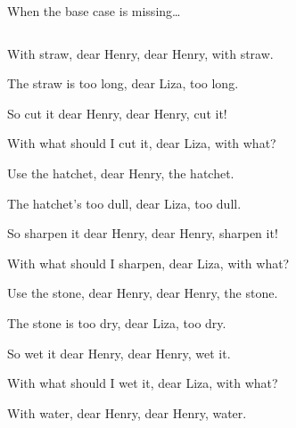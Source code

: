 \begin{Coupe}
\begin{frame}{When the base case is missing\ldots}
\begin{columns}
\begin{column}{.55\linewidth}
\begin{block}
{          %
          With straw, dear Henry, dear Henry, with \alert{straw}.

          The straw is too long, dear Liza, too long.
          
          So cut it dear Henry, dear Henry, cut it!
          
          With what should I cut it, dear Liza, with what?
          
          Use the hatchet, dear Henry, the \alert{hatchet}.
          
          The hatchet's too dull, dear Liza, too dull.

          So sharpen it dear Henry, dear Henry, sharpen it!

          With what should I sharpen, dear Liza, with what?

          Use the stone, dear Henry, dear Henry, the \alert{stone}.

          The stone is too dry, dear Liza, too dry.

          So wet it dear Henry, dear Henry, wet it.
          
          With what should I wet it, dear Liza, with what?
          
          With water, dear Henry, dear Henry, \alert{water}.
          
}
\end{block}
\end{column}
\end{columns}
\end{frame}
\end{Coupe}
